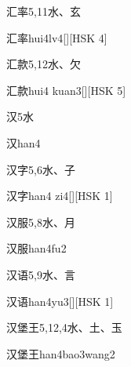 \begin{entry}{汇率}{5,11}{⽔、⽞}
  \begin{phonetics}{汇率}{hui4lv4}[][HSK 4]
  \end{phonetics}
\end{entry}

\begin{entry}{汇款}{5,12}{⽔、⽋}
  \begin{phonetics}{汇款}{hui4 kuan3}[][HSK 5]
  \end{phonetics}
\end{entry}

\begin{entry}{汉}{5}{⽔}
  \begin{phonetics}{汉}{han4}
  \end{phonetics}
\end{entry}

\begin{entry}{汉字}{5,6}{⽔、⼦}
  \begin{phonetics}{汉字}{han4 zi4}[][HSK 1]
  \end{phonetics}
\end{entry}

\begin{entry}{汉服}{5,8}{⽔、⽉}
  \begin{phonetics}{汉服}{han4fu2}
  \end{phonetics}
\end{entry}

\begin{entry}{汉语}{5,9}{⽔、⾔}
  \begin{phonetics}{汉语}{han4yu3}[][HSK 1]
  \end{phonetics}
\end{entry}

\begin{entry}{汉堡王}{5,12,4}{⽔、⼟、⽟}
  \begin{phonetics}{汉堡王}{han4bao3wang2}
  \end{phonetics}
\end{entry}

